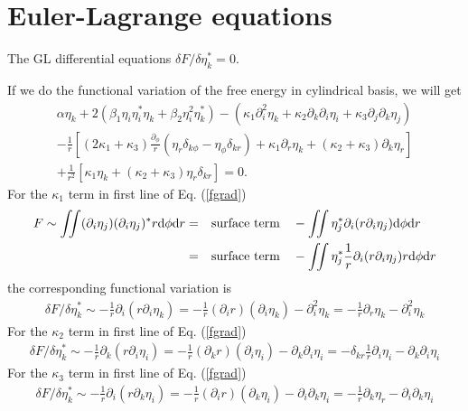 \documentclass[aps,prl,preprint]{revtex4-2}
\begin{document}
\section{Euler-Lagrange equations}

The GL differential equations $\delta F/\delta\eta_k^*=0$.

If we do the functional variation of the free energy in cylindrical basis, we will get
\begin{align}
    \alpha\eta_k+2(\beta_1\eta_i\eta_i^*\eta_k
    +\beta_2\eta_i^2\eta_k^*)-\left(\kappa_1\partial_i^2\eta_k
    +\kappa_2\partial_k\partial_i\eta_i
    +\kappa_3\partial_j\partial_k\eta_j\right)\nonumber\\
    -\frac{1}{r}\left[(2\kappa_1+\kappa_3)\frac{\partial_\phi}{r}
    \left(\eta_r\delta_{k\phi}-\eta_\phi\delta_{kr}\right)+\kappa_1\partial_r\eta_k
    +(\kappa_2+\kappa_3)\partial_k\eta_r\right]\nonumber\\
    +\frac{1}{r^2}[\kappa_1\eta_k+(\kappa_2+\kappa_3)\eta_r\delta_{kr}]
    =0.
\end{align}
For the $\kappa_1$ term in first line of Eq. (\ref{fgrad})
\begin{align}
    F\sim\iint (\partial_i\eta_j)(\partial_i\eta_j)^* r\dd\phi\dd r
    =&\qq{surface term} - \iint \eta_j^*\partial_i(r\partial_i\eta_j) \dd\phi\dd r\\
    =&\qq{surface term} - \iint \eta_j^*\frac{1}{r}\partial_i(r\partial_i\eta_j) r\dd\phi\dd r
\end{align}
the corresponding functional variation is
\begin{align}
    \delta F/\delta\eta_k^*\sim-\frac{1}{r}\partial_i(r\partial_i\eta_k)
    =-\frac{1}{r}(\partial_i r)(\partial_i\eta_k)-\partial_i^2\eta_k
    =-\frac{1}{r}\partial_r\eta_k - \partial_i^2\eta_k
\end{align}
For the $\kappa_2$ term in first line of Eq. (\ref{fgrad})
\begin{align}
    \delta F/\delta\eta_k^*\sim-\frac{1}{r}\partial_k(r\partial_i\eta_i)
    =-\frac{1}{r}(\partial_k r)(\partial_i\eta_i)-\partial_k\partial_i\eta_i
    =-\delta_{kr}\frac{1}{r}\partial_i\eta_i - \partial_k\partial_i\eta_i
\end{align}
For the $\kappa_3$ term in first line of Eq. (\ref{fgrad})
\begin{align}
    \delta F/\delta\eta_k^*\sim-\frac{1}{r}\partial_i(r\partial_k\eta_i)
    =-\frac{1}{r}(\partial_i r)(\partial_k\eta_i)-\partial_i\partial_k\eta_i
    =-\frac{1}{r}\partial_k\eta_r - \partial_i\partial_k\eta_i
\end{align}
\end{document}
